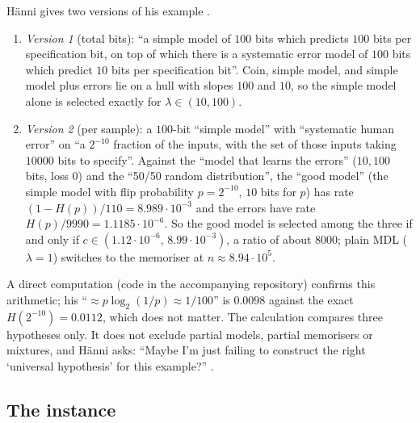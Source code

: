 \begin{remark}\label{rem:teacher:hanni}
H\"anni gives two versions of his example \citep{hanni2026notes,hanni2026lesswrong}.
\begin{enumerate}[label=(\arabic*)]
\item \emph{Version 1} (total bits): ``a simple model of $100$ bits which predicts $100$ bits per specification bit, on top of which there is a systematic error model of $100$ bits which predict $10$ bits per specification bit''. Coin, simple model, and simple model plus errors lie on a hull with slopes $100$ and $10$, so the simple model alone is selected exactly for $\lambda\in(10,100)$.
\item \emph{Version 2} (per sample): a $100$-bit ``simple model'' with ``systematic human error'' on ``a $2^{-10}$ fraction of the inputs, with the set of those inputs taking $10000$ bits to specify''. Against the ``model that learns the errors'' ($10{,}100$ bits, loss $0$) and the ``50/50 random distribution'', the ``good model'' (the simple model with flip probability $p=2^{-10}$, $10$ bits for $p$) has rate $(1-H(p))/110=8.989\cdot10^{-3}$ and the errors have rate $H(p)/9990=1.1185\cdot10^{-6}$. So the good model is selected among the three if and only if $c\in(1.12\cdot10^{-6},\,8.99\cdot10^{-3})$, a ratio of about $8000$; plain MDL ($\lambda=1$) switches to the memoriser at $n\approx8.94\cdot10^5$.
\end{enumerate}
A direct computation (code in the accompanying repository) confirms this arithmetic; his ``$\approx p\log_2(1/p)\approx1/100$'' is $0.0098$ against the exact $H(2^{-10})=0.0112$, which does not matter. The calculation compares three hypotheses only. It does not exclude partial models, partial memorisers or mixtures, and H\"anni asks: ``Maybe I'm just failing to construct the right `universal hypothesis' for this example?'' \citep{hanni2026lesswrong}.
\end{remark}

\subsection{The instance}\label{sec:teacher:instance}

